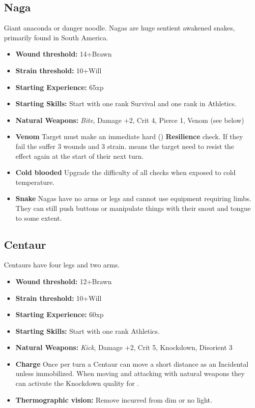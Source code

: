 \documentclass{book}
\begin{document}
\begin{multicols}{2}
	\subsection{Naga}
	Giant anaconda or danger noodle. Nagas are huge sentient awakened snakes, primarily found in South America.
	
	\begin{itemize}
		\item \textbf{Wound threshold:} 14+Brawn
		\item \textbf{Strain threshold:} 10+Will
		\item \textbf{Starting Experience:} 65xp
		\item \textbf{Starting Skills:} Start with one rank Survival and one rank in Athletics.
		\item \textbf{Natural Weapons:} \textit{Bite}, Damage +2, Crit 4, Pierce 1, Venom (see below)
		\item \textbf{Venom} Target must make an immediate hard (\DifficultyDie \DifficultyDie \DifficultyDie) \textbf{Resilience} check. If they fail the suffer 3 wounds and 3 strain. \Threat \Threat \Threat means the target need to resist the effect again at the start of their next turn.
		\item \textbf{Cold blooded} Upgrade the difficulty of all checks when exposed to cold temperature.
		\item \textbf{Snake} Nagas have no arms or legs and cannot use equipment requiring limbs. They can still push buttons or manipulate things with their snout and tongue to some extent.
	\end{itemize}
	
	
	\subsection{Centaur}
	Centaurs have four legs and two arms.
	
	\begin{itemize}
		\item \textbf{Wound threshold:} 12+Brawn
		\item \textbf{Strain threshold:} 10+Will
		\item \textbf{Starting Experience:} 60xp
		\item \textbf{Starting Skills:} Start with one rank Athletics.
		\item \textbf{Natural Weapons:} \textit{Kick}, Damage +2, Crit 5, Knockdown, Disorient 3
		\item \textbf{Charge} Once per turn a Centaur can move a short distance as an Incidental unless immobilized. When moving and attacking with natural weapons they can activate the Knockdown quality for \Advantage.
		\item \textbf{Thermographic vision:} Remove \SetbackDie \SetbackDie incurred from dim or no light.
	\end{itemize}
\end{multicols}
\end{document}
